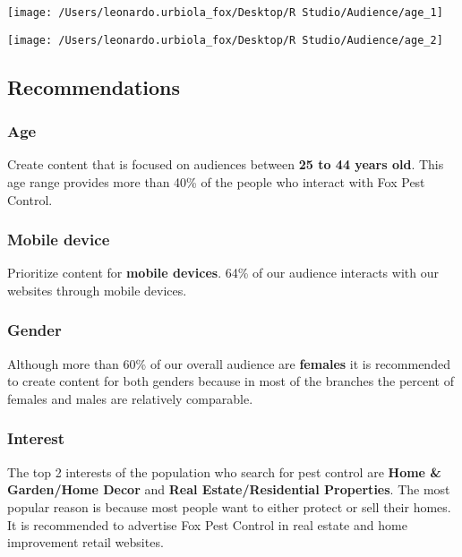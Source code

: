 \documentclass[
]{article}
\begin{document}
\begin{center}\texttt{[image: /Users/leonardo.urbiola\_fox/Desktop/R Studio/Audience/age\_1]} \end{center}

\begin{center}\texttt{[image: /Users/leonardo.urbiola\_fox/Desktop/R Studio/Audience/age\_2]} \end{center}

\hypertarget{recommendations}{%
\subsection{Recommendations}\label{recommendations}}

\hypertarget{age}{%
\subsubsection{Age}\label{age}}

Create content that is focused on audiences between \textbf{25 to 44
years old}. This age range provides more than 40\% of the people who
interact with Fox Pest Control.

\hypertarget{mobile-device}{%
\subsubsection{Mobile device}\label{mobile-device}}

Prioritize content for \textbf{mobile devices}. 64\% of our audience
interacts with our websites through mobile devices.

\hypertarget{gender}{%
\subsubsection{Gender}\label{gender}}

Although more than 60\% of our overall audience are \textbf{females} it
is recommended to create content for both genders because in most of the
branches the percent of females and males are relatively comparable.

\hypertarget{interest}{%
\subsubsection{Interest}\label{interest}}

The top 2 interests of the population who search for pest control are
\textbf{Home \& Garden/Home Decor} and \textbf{Real Estate/Residential
Properties}. The most popular reason is because most people want to
either protect or sell their homes. It is recommended to advertise Fox
Pest Control in real estate and home improvement retail websites.
\end{document}
